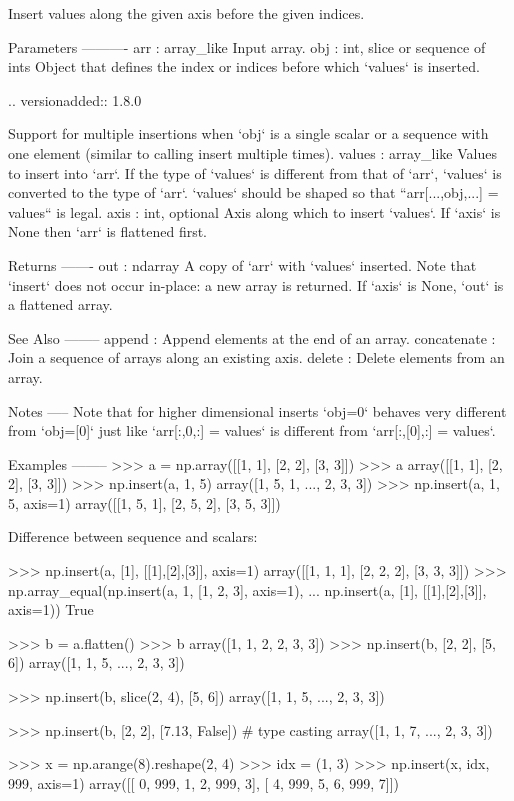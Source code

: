 \begin{DoxyVerb}Insert values along the given axis before the given indices.

Parameters
----------
arr : array_like
    Input array.
obj : int, slice or sequence of ints
    Object that defines the index or indices before which `values` is
    inserted.

    .. versionadded:: 1.8.0

    Support for multiple insertions when `obj` is a single scalar or a
    sequence with one element (similar to calling insert multiple
    times).
values : array_like
    Values to insert into `arr`. If the type of `values` is different
    from that of `arr`, `values` is converted to the type of `arr`.
    `values` should be shaped so that ``arr[...,obj,...] = values``
    is legal.
axis : int, optional
    Axis along which to insert `values`.  If `axis` is None then `arr`
    is flattened first.

Returns
-------
out : ndarray
    A copy of `arr` with `values` inserted.  Note that `insert`
    does not occur in-place: a new array is returned. If
    `axis` is None, `out` is a flattened array.

See Also
--------
append : Append elements at the end of an array.
concatenate : Join a sequence of arrays along an existing axis.
delete : Delete elements from an array.

Notes
-----
Note that for higher dimensional inserts `obj=0` behaves very different
from `obj=[0]` just like `arr[:,0,:] = values` is different from
`arr[:,[0],:] = values`.

Examples
--------
>>> a = np.array([[1, 1], [2, 2], [3, 3]])
>>> a
array([[1, 1],
       [2, 2],
       [3, 3]])
>>> np.insert(a, 1, 5)
array([1, 5, 1, ..., 2, 3, 3])
>>> np.insert(a, 1, 5, axis=1)
array([[1, 5, 1],
       [2, 5, 2],
       [3, 5, 3]])

Difference between sequence and scalars:

>>> np.insert(a, [1], [[1],[2],[3]], axis=1)
array([[1, 1, 1],
       [2, 2, 2],
       [3, 3, 3]])
>>> np.array_equal(np.insert(a, 1, [1, 2, 3], axis=1),
...                np.insert(a, [1], [[1],[2],[3]], axis=1))
True

>>> b = a.flatten()
>>> b
array([1, 1, 2, 2, 3, 3])
>>> np.insert(b, [2, 2], [5, 6])
array([1, 1, 5, ..., 2, 3, 3])

>>> np.insert(b, slice(2, 4), [5, 6])
array([1, 1, 5, ..., 2, 3, 3])

>>> np.insert(b, [2, 2], [7.13, False]) # type casting
array([1, 1, 7, ..., 2, 3, 3])

>>> x = np.arange(8).reshape(2, 4)
>>> idx = (1, 3)
>>> np.insert(x, idx, 999, axis=1)
array([[  0, 999,   1,   2, 999,   3],
       [  4, 999,   5,   6, 999,   7]])\end{DoxyVerb}
 \mbox{\label{namespacenumpy_1_1lib_1_1function__base_ab90151ca1ca87c31bc09a413515feba3}} 
